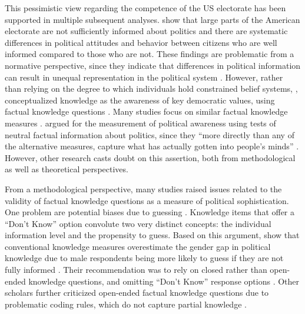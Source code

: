 \documentclass[12pt]{article}
\begin{document}
This pessimistic view regarding the competence of the US electorate has been supported in multiple subsequent analyses. \citet{carpini1996americans} show that large parts of the American electorate are not sufficiently informed about politics and there are systematic differences in political attitudes and behavior between citizens who are well informed compared to those who are not. These findings are problematic from a normative perspective, since they indicate that differences in political information can result in unequal representation in the political system \citep[see also][]{althaus1998information,kuklinski2000misinformation,gilens2001political}. However, rather than relying on the degree to which individuals hold constrained belief systems, \citet{carpini1996americans}, conceptualized knowledge as the awareness of key democratic values, using factual knowledge questions \citep[see also][]{carpini1993measuring}. Many studies focus on similar factual knowledge measures \citep[e.g.][]{zaller1991information,jacoby1995structure,gomez2001political}.  \citet{zaller1992nature} argued for the measurement of political awareness using tests of neutral factual information about politics, since they ``more directly than any of the alternative measures, capture what has actually gotten into people’s minds'' \citep[21]{zaller1992nature}. However, other research casts doubt on this assertion, both from methodological as well as theoretical perspectives.

From a methodological perspective, many studies raised issues related to the validity of factual knowledge questions as a measure of political sophistication. One problem  are potential biases due to guessing \citep{mondak2000reconsidering,mondak2001developing,mondak2001asked,miller2008experimenting}. Knowledge items that offer a ``Don't Know'' option convolute two very distinct concepts: the individual information level and the propensity to guess. Based on this argument, \citet{mondak2004knowledge} show that conventional knowledge measures overestimate the gender gap in political knowledge due to male respondents being more likely to guess if they are not fully informed \citep[see also][]{pietryka2013analysis}. Their recommendation was to rely on closed rather than open-ended knowledge questions, and omitting ``Don't Know'' response options \citep[but see][]{sturgis2008experiment,luskin2011don}. Other scholars further criticized open-ended factual knowledge questions due to problematic coding rules, which do not capture partial knowledge \citep{krosnick2008problems,gibson2009knowing,debell2013harder}.
\end{document}
